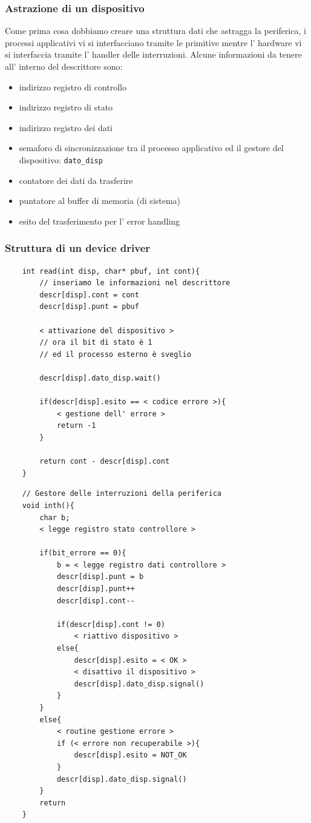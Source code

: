 \subsubsection{Astrazione di un dispositivo}
Come prima cosa dobbiamo creare una struttura dati che astragga la periferica, i processi applicativi vi si interfacciano tramite le primitive mentre l' hardware vi si interfaccia tramite l' handler delle interruzioni.
Alcune informazioni da tenere all' interno del descrittore sono:
\begin{itemize}
    \item indirizzo registro di controllo
    \item indirizzo registro di stato
    \item indirizzo registro dei dati
    \item semaforo di sincronizzazione tra il processo applicativo ed il gestore del dispositivo: \verb{dato_disp{
    \item contatore dei dati da trasferire
    \item puntatore al buffer di memoria (di sistema)
    \item esito del trasferimento per l' error handling
\end{itemize}

\subsubsection{Struttura di un device driver}
\begin{verbatim}
    int read(int disp, char* pbuf, int cont){
        // inseriamo le informazioni nel descrittore
        descr[disp].cont = cont
        descr[disp].punt = pbuf
        
        < attivazione del dispositivo >
        // ora il bit di stato è 1
        // ed il processo esterno è sveglio
        
        descr[disp].dato_disp.wait()
        
        if(descr[disp].esito == < codice errore >){
            < gestione dell' errore >
            return -1
        }
        
        return cont - descr[disp].cont
    }
\end{verbatim}
    
\begin{verbatim}
    // Gestore delle interruzioni della periferica
    void inth(){
        char b;
        < legge registro stato controllore >
        
        if(bit_errore == 0){
            b = < legge registro dati controllore >
            descr[disp].punt = b
            descr[disp].punt++
            descr[disp].cont--
            
            if(descr[disp].cont != 0)
                < riattivo dispositivo >
            else{
                descr[disp].esito = < OK >
                < disattivo il dispositivo >
                descr[disp].dato_disp.signal()
            }
        }
        else{
            < routine gestione errore >
            if (< errore non recuperabile >){
                descr[disp].esito = NOT_OK
            }
            descr[disp].dato_disp.signal()
        }
        return
    }
\end{verbatim}

